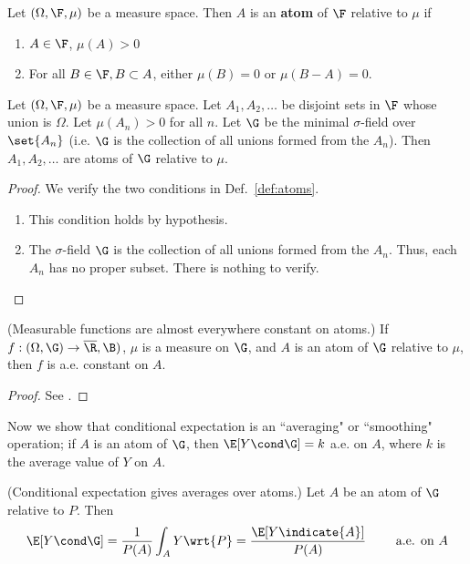 \documentclass{article} %
\begin{document}
\begin{definition}
Let $(\Omega, \F, 
\mu)$ be a measure space.  Then $A$ is an \textbf{atom} of $\F$ relative to $\mu$ if
\begin{enumerate}
	\item $A \in \F$, $\mu(A) > 0$
	\item For all $B \in \F, B \subset A$, either $\mu(B)=0$ or $\mu(B-A)=0$.
\end{enumerate} 
\label{def:atoms}
\end{definition}


\begin{example}    Let $(\Omega, \F, 
\mu)$ be a measure space. Let $A_1, A_2, \hdots$ be disjoint sets in $\F$ whose union is $\Omega$.  Let $\mu(A_n) >0$ for all $n$.  Let $\G$ be the minimal $\sigma$-field over $\set{A_n}$ (i.e. $\G$ is the collection of all unions formed from the $A_n$).  Then $A_1, A_2, \hdots$ are atoms of $\G$ relative to $\mu$.
\label{ex:measurable_partition_has_cells_which_are_atoms}
\end{example}
	
\begin{proof} We verify the two conditions in Def.~\ref{def:atoms}.
\begin{enumerate}
	\item This condition holds by hypothesis. 
	\item The $\sigma$-field $\G$ is the collection of all unions formed from the $A_n$.  Thus, each $A_n$ has no proper subset.  There is nothing to verify. 
\end{enumerate} 
\end{proof}

\begin{lemma}\textnormal{(Measurable functions are almost everywhere constant on atoms.)}
If $f: (\Omega, \G) \to \overline{\R}, \B)$, $\mu$ is a measure on $\G$, and $A$ is an atom of $\G$ relative to $\mu$, then $f$ is a.e. constant on $A$.
\label{lemma:measurable_functions_are_almost_everywhere_constant_on_atoms}
\end{lemma}

\begin{proof}
See \cite[Lemma 5.5.8, pp. 225]{ash2000probability}.	
\end{proof}

Now we show that conditional expectation is an ``averaging" or ``smoothing" operation; if $A$ is an atom of $\G$, then $ \E[Y \cond \G]  = k$ a.e. on $A$, where $k$ is the average value of $Y$ on $A$.
\begin{theorem}
\textnormal{(Conditional expectation gives averages over atoms.)}
Let $A$ be an atom of $\G$ relative to $P$. Then 
\[ \E[Y \cond \G] = \frac{1}{P(A)} \int_A Y \wrt{P} = \frac{\E[Y \indicate{A}]}{P(A)}   \quad \quad \text{ a.e. on } A \]	
\label{thm:conditional_expectation_as_average_over_atoms}
\end{theorem}
\end{document}
